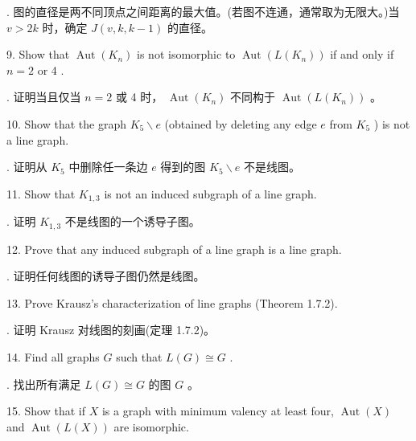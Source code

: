 \documentclass[10pt]{article}
\begin{document}
\begin{tcolorbox}. 图的直径是两不同顶点之间距离的最大值。(若图不连通，通常取为无限大。)当 \(v > {2k}\) 时，确定 \(J\left( {v,k,k - 1}\right)\) 的直径。
\end{tcolorbox}

9. Show that \(\operatorname{Aut}\left( {K}_{n}\right)\) is not isomorphic to \(\operatorname{Aut}\left( {L\left( {K}_{n}\right) }\right)\) if and only if \(n = 2\) or 4 .

\begin{tcolorbox}. 证明当且仅当 \(n = 2\) 或 4 时， \(\operatorname{Aut}\left( {K}_{n}\right)\) 不同构于 \(\operatorname{Aut}\left( {L\left( {K}_{n}\right) }\right)\) 。
\end{tcolorbox}

10. Show that the graph \({K}_{5} \smallsetminus  e\) (obtained by deleting any edge \(e\) from \({K}_{5}\) ) is not a line graph.

\begin{tcolorbox}. 证明从 \({K}_{5}\) 中删除任一条边 \(e\) 得到的图 \({K}_{5} \smallsetminus  e\) 不是线图。
\end{tcolorbox}

11. Show that \({K}_{1,3}\) is not an induced subgraph of a line graph.

\begin{tcolorbox}. 证明 \({K}_{1,3}\) 不是线图的一个诱导子图。
\end{tcolorbox}

12. Prove that any induced subgraph of a line graph is a line graph.

\begin{tcolorbox}. 证明任何线图的诱导子图仍然是线图。
\end{tcolorbox}

13. Prove Krausz's characterization of line graphs (Theorem 1.7.2).

\begin{tcolorbox}. 证明 Krausz 对线图的刻画(定理 1.7.2)。
\end{tcolorbox}

14. Find all graphs \(G\) such that \(L\left( G\right)  \cong  G\) .

\begin{tcolorbox}. 找出所有满足 \(L\left( G\right)  \cong  G\) 的图 \(G\) 。
\end{tcolorbox}

15. Show that if \(X\) is a graph with minimum valency at least four, \(\operatorname{Aut}\left( X\right)\) and \(\operatorname{Aut}\left( {L\left( X\right) }\right)\) are isomorphic.
\end{document}
